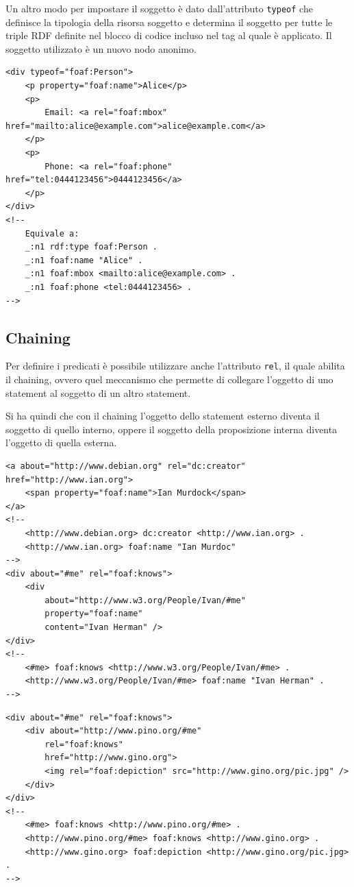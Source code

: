 Un altro modo per impostare il soggetto è dato dall'attributo \texttt{typeof} che definisce la tipologia della risorsa soggetto e determina il soggetto per tutte le triple RDF definite nel blocco di codice incluso nel tag al quale è applicato. Il soggetto utilizzato è un nuovo nodo anonimo.

\begin{lstlisting}[language=RDFA, caption=Utilizzo di typeof]
<div typeof="foaf:Person">
	<p property="foaf:name">Alice</p> 
	<p>
		Email: <a rel="foaf:mbox" href="mailto:alice@example.com">alice@example.com</a>
	</p>
	<p>
		Phone: <a rel="foaf:phone" href="tel:0444123456">0444123456</a>
	</p>
</div>
<!--
	Equivale a:
	_:n1 rdf:type foaf:Person .
	_:n1 foaf:name "Alice" .
	_:n1 foaf:mbox <mailto:alice@example.com> .
	_:n1 foaf:phone <tel:0444123456> .
-->
\end{lstlisting}

\subsection{Chaining}

Per definire i predicati è possibile utilizzare anche l'attributo \texttt{rel}, il quale abilita il chaining, ovvero quel meccanismo che permette di collegare l'oggetto di uno statement al soggetto di un altro statement.

Si ha quindi che con il chaining l'oggetto dello statement esterno diventa il soggetto di quello interno, oppere il soggetto della proposizione interna diventa l'oggetto di quella esterna.

\begin{lstlisting}[language=RDFA, caption=Esempi di chaining]
<a about="http://www.debian.org" rel="dc:creator" href="http://www.ian.org">
	<span property="foaf:name">Ian Murdock</span>
</a>
<!--
	<http://www.debian.org> dc:creator <http://www.ian.org> .
	<http://www.ian.org> foaf:name "Ian Murdoc"
-->
<div about="#me" rel="foaf:knows">
	<div 
		about="http://www.w3.org/People/Ivan/#me"
		property="foaf:name"
		content="Ivan Herman" />
</div>
<!--
	<#me> foaf:knows <http://www.w3.org/People/Ivan/#me> .
	<http://www.w3.org/People/Ivan/#me> foaf:name "Ivan Herman" .
-->
\end{lstlisting}

\begin{lstlisting}[language=RDFA, caption=Io conosco pino che conosce gino che ha una determinata foto]
<div about="#me" rel="foaf:knows">
	<div about="http://www.pino.org/#me"
		rel="foaf:knows"
		href="http://www.gino.org">
		<img rel="foaf:depiction" src="http://www.gino.org/pic.jpg" />
	</div>
</div>
<!-- 
	<#me> foaf:knows <http://www.pino.org/#me> .
	<http://www.pino.org/#me> foaf:knows <http://www.gino.org> .
	<http://www.gino.org> foaf:depiction <http://www.gino.org/pic.jpg> .
-->
\end{lstlisting}

